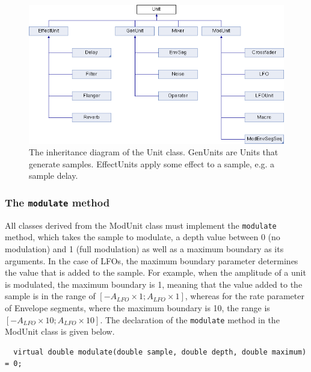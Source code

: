 \documentclass[12pt,twoside]{report}
\begin{document}
\begin{figure}
  \includegraphics[scale=0.5]{img/unit-inherit}
  \caption{The inheritance diagram of the Unit class. GenUnits are Units that generate samples. EffectUnits apply some effect to a sample, e.g. a sample delay.}
  \label{fig:unit-inherit}
\end{figure}


\subsubsection{The \texttt{modulate} method}

All classes derived from the ModUnit class must implement the \texttt{modulate} method, which takes the sample to modulate, a depth value between 0 (no modulation) and 1 (full modulation) as well as a maximum boundary as its arguments. In the case of LFOs, the maximum boundary parameter determines the value that is added to the sample. For example, when the amplitude of a unit is modulated, the maximum boundary is 1, meaning that the value added to the sample is in the range of $[-A_{LFO} \times 1; A_{LFO} \times 1]$, whereas for the rate parameter of Envelope segments, where the maximum boundary is 10, the range is $[-A_{LFO} \times 10; A_{LFO} \times 10]$. The declaration of the \texttt{modulate} method in the ModUnit class is given below.

\begin{lstlisting}
  virtual double modulate(double sample, double depth, double maximum) = 0;
\end{lstlisting}
\end{document}

